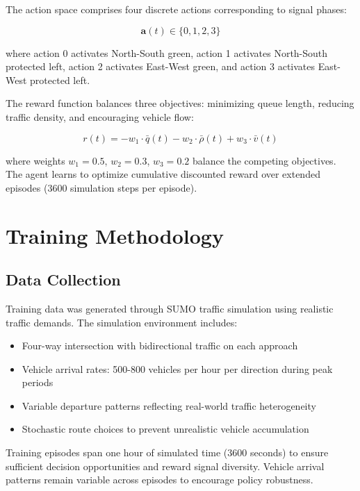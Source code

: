 \documentclass[10pt,conference]{IEEEtran}
\begin{document}
The action space comprises four discrete actions corresponding to signal phases:

\begin{equation}
\mathbf{a}(t) \in \{0, 1, 2, 3\}
\end{equation}

where action 0 activates North-South green, action 1 activates North-South protected left, action 2 activates East-West green, and action 3 activates East-West protected left.

The reward function balances three objectives: minimizing queue length, reducing traffic density, and encouraging vehicle flow:

\begin{equation}
r(t) = -w_1 \cdot \bar{q}(t) - w_2 \cdot \bar{\rho}(t) + w_3 \cdot \bar{v}(t)
\end{equation}

where weights $w_1 = 0.5$, $w_2 = 0.3$, $w_3 = 0.2$ balance the competing objectives. The agent learns to optimize cumulative discounted reward over extended episodes (3600 simulation steps per episode).

\section{Training Methodology}

\subsection{Data Collection}

Training data was generated through SUMO traffic simulation using realistic traffic demands. The simulation environment includes:
\begin{itemize}
    \item Four-way intersection with bidirectional traffic on each approach
    \item Vehicle arrival rates: 500-800 vehicles per hour per direction during peak periods
    \item Variable departure patterns reflecting real-world traffic heterogeneity
    \item Stochastic route choices to prevent unrealistic vehicle accumulation
\end{itemize}

Training episodes span one hour of simulated time (3600 seconds) to ensure sufficient decision opportunities and reward signal diversity. Vehicle arrival patterns remain variable across episodes to encourage policy robustness.
\end{document}
